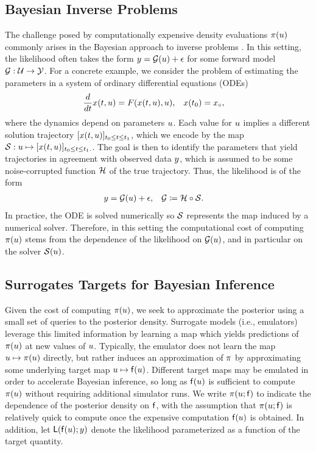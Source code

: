 \documentclass[12pt]{article}
\begin{document}
\subsection{Bayesian Inverse Problems}
The challenge posed by computationally expensive density evaluations $\pi(u)$ commonly 
arises in the Bayesian approach to inverse problems \citep{Stuart_BIP}. In this setting, 
the likelihood often takes the form $y = \mathcal{G}(u) + \epsilon$ for some forward model
$\mathcal{G}: \mathcal{U} \to \mathcal{Y}$. For a concrete example, we consider the problem of estimating the 
parameters in a system of ordinary differential equations (ODEs)
\begin{align}
\frac{d}{dt} x(t, u) &= F(x(t, u), u), &&x(t_0) = x_{\circ}, \label{ode_ivp}
\end{align}
where the dynamics depend on parameters $u$. Each value for $u$ implies a different solution trajectory
$[x(t, u)]_{t_0 \leq t \leq t_1}$, which we encode by the
map $\mathcal{S}: u \mapsto [x(t, u)]_{t_0 \leq t \leq t_1.}$. The goal is then 
to identify the parameters that yield trajectories in agreement with observed data 
$y$, which is assumed to be some noise-corrupted function $\mathcal{H}$ of the true trajectory. Thus, the 
likelihood is of the form 
\begin{align}
&y = \mathcal{G}(u) + \epsilon, &&\mathcal{G} \coloneqq \mathcal{H} \circ \mathcal{S}. \label{eq:additive-noise}
\end{align}
In practice, the ODE is solved numerically so $\mathcal{S}$ represents the map induced by a numerical 
solver. Therefore, in this setting the computational cost of computing $\pi(u)$ stems from the 
dependence of the likelihood on $\mathcal{G}(u)$, and in particular on the solver $\mathcal{S}(u)$.

\subsection{Surrogates Targets for Bayesian Inference} \label{sec:surrogates-Bayes}
Given the cost of computing $\pi(u)$, we seek to approximate
the posterior using a small set of queries to the posterior density. 
Surrogate models (i.e., emulators) leverage this limited information by 
learning a map which yields predictions of $\pi(u)$ at new values 
of $u$. Typically, the emulator does not learn the map
$u \mapsto \pi(u)$ directly, but rather induces an approximation
of $\pi$ by approximating some underlying target map 
$u \mapsto \mathsf{f}(u)$. Different target maps may be emulated in order to
 accelerate Bayesian inference, so long as $\mathsf{f}(u)$ is sufficient to compute 
 $\pi(u)$ without requiring additional simulator runs. We write 
 $\pi(u; \mathsf{f})$ to indicate the dependence of the posterior density 
 on $\mathsf{f}$, with the assumption that $\pi(u; \mathsf{f})$ is relatively 
 quick to compute once the expensive computation $\mathsf{f}(u)$ is
 obtained. In addition, let $\mathsf{L}(\mathsf{f}(u); y)$ denote the likelihood parameterized
 as a function of the target quantity. 
 
\end{document}
